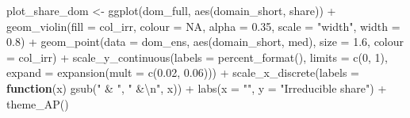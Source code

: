 \documentclass[
  11pt,
]{article}
\newenvironment{Shaded}{\begin{snugshade}}{\end{snugshade}}
\newcommand{\AttributeTok}[1]{\textcolor[rgb]{0.77,0.63,0.00}{#1}}
\newcommand{\ConstantTok}[1]{\textcolor[rgb]{0.00,0.00,0.00}{#1}}
\newcommand{\ControlFlowTok}[1]{\textcolor[rgb]{0.13,0.29,0.53}{\textbf{#1}}}
\newcommand{\DecValTok}[1]{\textcolor[rgb]{0.00,0.00,0.81}{#1}}
\newcommand{\FloatTok}[1]{\textcolor[rgb]{0.00,0.00,0.81}{#1}}
\newcommand{\FunctionTok}[1]{\textcolor[rgb]{0.00,0.00,0.00}{#1}}
\newcommand{\NormalTok}[1]{#1}
\newcommand{\OtherTok}[1]{\textcolor[rgb]{0.56,0.35,0.01}{#1}}
\newcommand{\SpecialCharTok}[1]{\textcolor[rgb]{0.00,0.00,0.00}{#1}}
\newcommand{\StringTok}[1]{\textcolor[rgb]{0.31,0.60,0.02}{#1}}
\begin{document}
\begin{Shaded}
\begin{Highlighting}[]
\NormalTok{plot\_share\_dom }\OtherTok{\textless{}{-}} \FunctionTok{ggplot}\NormalTok{(dom\_full, }\FunctionTok{aes}\NormalTok{(domain\_short, share)) }\SpecialCharTok{+}
  \FunctionTok{geom\_violin}\NormalTok{(}\AttributeTok{fill =}\NormalTok{ col\_irr, }\AttributeTok{colour =} \ConstantTok{NA}\NormalTok{, }\AttributeTok{alpha =} \FloatTok{0.35}\NormalTok{, }\AttributeTok{scale =} \StringTok{"width"}\NormalTok{,}
              \AttributeTok{width =} \FloatTok{0.8}\NormalTok{) }\SpecialCharTok{+}
  \FunctionTok{geom\_point}\NormalTok{(}\AttributeTok{data =}\NormalTok{ dom\_ens, }\FunctionTok{aes}\NormalTok{(domain\_short, med), }\AttributeTok{size =} \FloatTok{1.6}\NormalTok{,}
             \AttributeTok{colour =}\NormalTok{ col\_irr) }\SpecialCharTok{+}
  \FunctionTok{scale\_y\_continuous}\NormalTok{(}\AttributeTok{labels =} \FunctionTok{percent\_format}\NormalTok{(), }\AttributeTok{limits =} \FunctionTok{c}\NormalTok{(}\DecValTok{0}\NormalTok{, }\DecValTok{1}\NormalTok{),}
                     \AttributeTok{expand =} \FunctionTok{expansion}\NormalTok{(}\AttributeTok{mult =} \FunctionTok{c}\NormalTok{(}\FloatTok{0.02}\NormalTok{, }\FloatTok{0.06}\NormalTok{))) }\SpecialCharTok{+}
  \FunctionTok{scale\_x\_discrete}\NormalTok{(}\AttributeTok{labels =} \ControlFlowTok{function}\NormalTok{(x) }\FunctionTok{gsub}\NormalTok{(}\StringTok{" \& "}\NormalTok{, }\StringTok{" \&}\SpecialCharTok{\textbackslash{}n}\StringTok{"}\NormalTok{, x)) }\SpecialCharTok{+}
  \FunctionTok{labs}\NormalTok{(}\AttributeTok{x =} \StringTok{""}\NormalTok{, }\AttributeTok{y =} \StringTok{"Irreducible share"}\NormalTok{) }\SpecialCharTok{+}
  \FunctionTok{theme\_AP}\NormalTok{()}


\end{Highlighting}
\end{Shaded}
\end{document}
